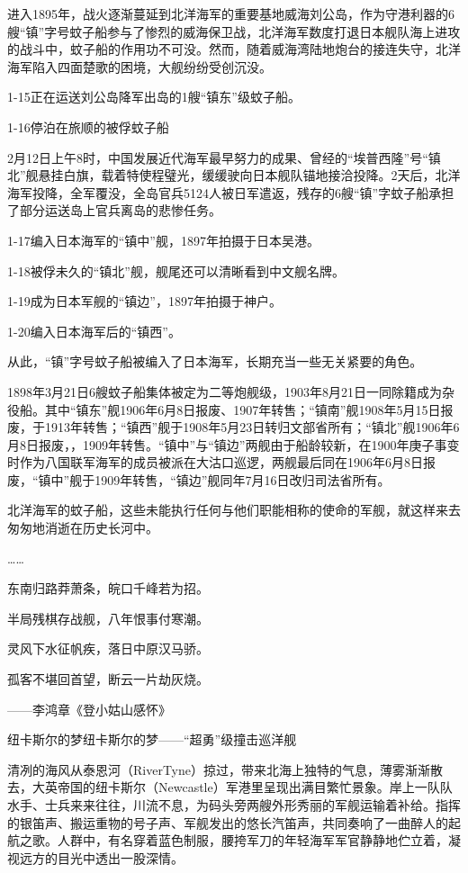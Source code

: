 \documentclass[12pt,UTF8]{ctexbook}
\begin{document}
进入1895年，战火逐渐蔓延到北洋海军的重要基地威海刘公岛，作为守港利器的6艘“镇”字号蚊子船参与了惨烈的威海保卫战，北洋海军数度打退日本舰队海上进攻的战斗中，蚊子船的作用功不可没。然而，随着威海湾陆地炮台的接连失守，北洋海军陷入四面楚歌的困境，大舰纷纷受创沉没。

1-15正在运送刘公岛降军出岛的1艘“镇东”级蚊子船。

1-16停泊在旅顺的被俘蚊子船

2月12日上午8时，中国发展近代海军最早努力的成果、曾经的“埃普西隆”号“镇北”舰悬挂白旗，载着特使程璧光，缓缓驶向日本舰队锚地接洽投降。2天后，北洋海军投降，全军覆没，全岛官兵5124人被日军遣返，残存的6艘“镇”字蚊子船承担了部分运送岛上官兵离岛的悲惨任务。

1-17编入日本海军的“镇中”舰，1897年拍摄于日本吴港。

1-18被俘未久的“镇北”舰，舰尾还可以清晰看到中文舰名牌。

1-19成为日本军舰的“镇边”，1897年拍摄于神户。

1-20编入日本海军后的“镇西”。

从此，“镇”字号蚊子船被编入了日本海军，长期充当一些无关紧要的角色。

1898年3月21日6艘蚊子船集体被定为二等炮舰级，1903年8月21日一同除籍成为杂役船。其中“镇东”舰1906年6月8日报废、1907年转售；“镇南”舰1908年5月15日报废，于1913年转售；“镇西”舰于1908年5月23日转归文部省所有；“镇北”舰1906年6月8日报废，，1909年转售。“镇中”与“镇边”两舰由于船龄较新，在1900年庚子事变时作为八国联军海军的成员被派在大沽口巡逻，两舰最后同在1906年6月8日报废，“镇中”舰于1909年转售，“镇边”舰同年7月16日改归司法省所有。

北洋海军的蚊子船，这些未能执行任何与他们职能相称的使命的军舰，就这样来去匆匆地消逝在历史长河中。

……

东南归路莽萧条，皖口千峰若为招。

半局残棋存战舰，八年恨事付寒潮。

灵风下水征帆疾，落日中原汉马骄。

孤客不堪回首望，断云一片劫灰烧。

——李鸿章《登小姑山感怀》

纽卡斯尔的梦纽卡斯尔的梦——“超勇”级撞击巡洋舰

清冽的海风从泰恩河（RiverTyne）掠过，带来北海上独特的气息，薄雾渐渐散去，大英帝国的纽卡斯尔（Newcastle）军港里呈现出满目繁忙景象。岸上一队队水手、士兵来来往往，川流不息，为码头旁两艘外形秀丽的军舰运输着补给。指挥的银笛声、搬运重物的号子声、军舰发出的悠长汽笛声，共同奏响了一曲醉人的起航之歌。人群中，有名穿着蓝色制服，腰挎军刀的年轻海军军官静静地伫立着，凝视远方的目光中透出一股深情。
\end{document}
